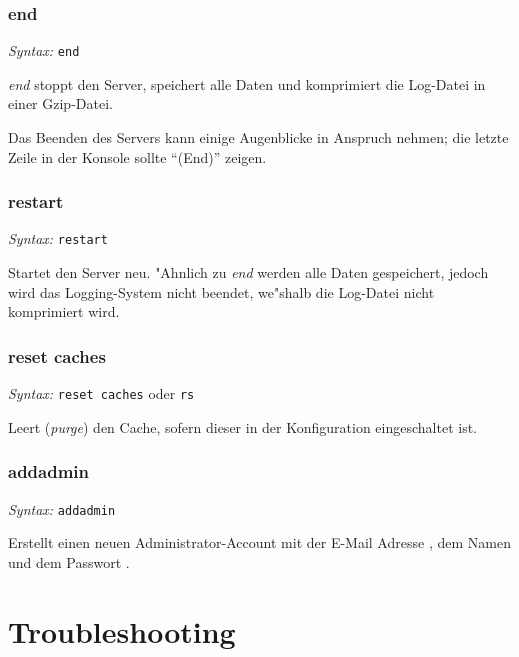 \subsubsection{end}

\hspace*{2cm}\emph{Syntax: } \lstinline{end}
\vspace*{0.2cm}

\emph{end} stoppt den Server, speichert alle Daten
und komprimiert die Log-Datei in einer Gzip-Datei.

Das Beenden des Servers kann einige Augenblicke
in Anspruch nehmen; die letzte Zeile in der
Konsole sollte ``(End)'' zeigen.

\subsubsection{restart}

\hspace*{2cm}\emph{Syntax: } \lstinline{restart}
\vspace*{0.2cm}

Startet den Server neu. "Ahnlich zu \emph{end}
werden alle Daten gespeichert, jedoch wird
das Logging-System nicht beendet, we"shalb
die Log-Datei nicht komprimiert wird.

\subsubsection{reset caches}

\hspace*{2cm}\emph{Syntax: } \lstinline{reset caches} oder \lstinline{rs}
\vspace*{0.2cm}

Leert (\emph{purge}) den Cache, sofern dieser
in der Konfiguration eingeschaltet ist.

\subsubsection{addadmin}

\hspace*{2cm}\emph{Syntax: } \lstinline{addadmin}   
\vspace*{0.2cm}

Erstellt einen neuen Administrator-Account mit
der E-Mail Adresse , dem Namen 
und dem Passwort .


\section{Troubleshooting}

